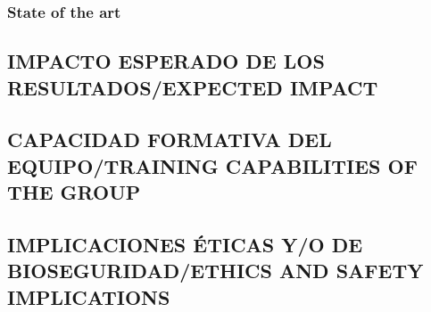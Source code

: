 \documentclass[a4paper,11pt,oneside]{article}
\begin{document}
\subsubsection*{\sc State of the art}



%
%
%
%
%
%
%
%

\subsection{\sc IMPACTO ESPERADO DE LOS RESULTADOS/EXPECTED IMPACT}
\subsection{\sc CAPACIDAD FORMATIVA DEL EQUIPO/TRAINING CAPABILITIES OF THE GROUP}
\subsection{\sc IMPLICACIONES ÉTICAS Y/O DE BIOSEGURIDAD/ETHICS AND SAFETY IMPLICATIONS}
\end{document}

